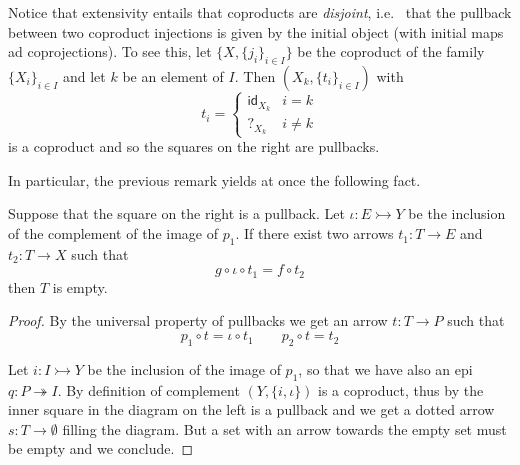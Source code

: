 \documentclass[a4paper,UKenglish,cleveref,pdftex,thm-restate,numberwithinsect]{lipics-v2021}
\def\X{\textbf {\textup{X}}}
\newcommand{\mto}{\rightarrowtail}
\newcommand{\eto}{\twoheadrightarrow}
\newcommand{\id}[1]{\mathsf{id}_{#1}}
\begin{document}
\noindent
\parbox{11cm}{
\begin{remark}\label{rem:disj}
	Notice that extensivity entails that coproducts are \emph{disjoint}, i.e.~ that the pullback between two coproduct injections is given by the initial object (with initial maps ad coprojections). To see this, let $\{X, \{j_i\}_{i\in I}\}$ be the coproduct of the family $\{X_i\}_{i\in I}$ and let $k$ be an element of $I$. Then  $(X_k, \{t_i\}_{i\in I})$ with
	\[t_i=\begin{cases}
		\id{X_k} & i=k\\?_{X_k} & i\neq k
	\end{cases}\]
	is a coproduct and so the squares on the right are pullbacks.
\end{remark}}\hfill\parbox{2cm}{\vspace{-1.5cm} \xymatrix@R=15pt{X_k \ar[r]_{\id{X}} \ar[d]_{\id{X}}& X_k \ar@{>->}[d]^{j_k}\\X_k \ar@{>->}[r]^{j_k} & X}}


In particular, the previous remark yields at once the following fact.

\noindent 
\parbox{11.5cm}{\begin{proposition}\label{prop:isempty}
	Suppose that the square on the right is a pullback. Let $\iota \colon E\mto Y$ be the inclusion of the complement of the image of $p_1$. If there exist two  arrows $t_1\colon T\to E$ and $t_2\colon T\to X$ such that \[g\circ \iota\circ t_1= f\circ t_2\] then $T$ is empty.
\end{proposition}}\hfill \parbox{2cm}{\vspace{-1.5cm}}
\begin{proof}
	By the universal property of pullbacks we get an arrow $t\colon T\to P$ such that 
	\[p_1\circ t=\iota \circ t_1 \qquad p_2\circ t=t_2\]
	\parbox{2cm}{}\hfill \parbox{10.5cm}{Let $i\colon I\mto Y$ be the inclusion of the image of $p_1$, so that we have also an epi $q\colon P\eto I$. By definition of complement $(Y, \{i, \iota\})$ is a coproduct, thus by   the inner square in the diagram on the left is a pullback and we get a dotted arrow $s\colon T\to \emptyset$ filling the diagram. But a set with an arrow towards the empty set must be empty and we conclude. \qedhere }
\end{proof}
\end{document}
